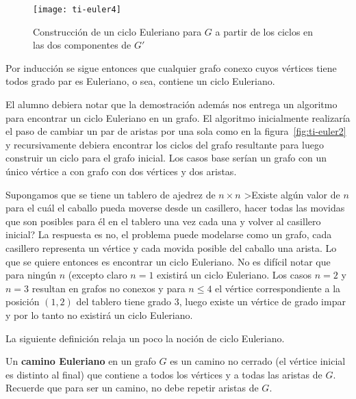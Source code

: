 \begin{teorema}
\begin{demostracion}
\begin{inducciondemo}
  \begin{figure}[h!]
  \centering
  \texttt{[image: ti-euler4]}
  \caption{Construcción de un ciclo Euleriano para $G$ a partir de los ciclos en las dos componentes de $G'$}
  \label{fig:ti-euler4}
  \end{figure}
  
  Por inducción se sigue entonces que cualquier grafo conexo cuyos vértices tiene todos grado par es Euleriano, o sea, contiene un ciclo Euleriano.
\end{inducciondemo}
\end{demostracion}
\end{teorema}

El alumno debiera notar que la demostración además nos entrega un algoritmo para encontrar un ciclo Euleriano en un grafo.
El algoritmo inicialmente realizaría el paso de cambiar un par de aristas por una sola como en la figura~\ref{fig:ti-euler2} y recursivamente debiera encontrar los ciclos del grafo resultante para luego construir un ciclo para el grafo inicial.
Los casos base serían un grafo con un único vértice a con grafo con dos vértices y dos aristas.

\begin{ejemplo}
Supongamos que se tiene un tablero de ajedrez de $n\times n$
>Existe algún valor de $n$ para el cuál el caballo pueda moverse desde un casillero, hacer todas las movidas que son posibles para él en el tablero una vez cada una y volver al casillero inicial?
La respuesta es no, el problema puede modelarse como un grafo, cada casillero representa un vértice y cada movida posible del caballo una arista.
Lo que se quiere entonces es encontrar un ciclo Euleriano.
No es difícil notar que para ningún $n$ (excepto claro $n=1$ existirá un ciclo Euleriano.
Los casos $n=2$ y $n=3$ resultan en grafos no conexos y para $n\leq 4$ el vértice correspondiente a la posición $(1,2)$ del tablero tiene grado $3$, luego existe un vértice de grado impar y por lo tanto no existirá un ciclo Euleriano.
\end{ejemplo}

La siguiente definición relaja un poco la noción de ciclo Euleriano.

\begin{definicion}
Un {\bf camino Euleriano} en un grafo $G$ es un camino no cerrado (el vértice inicial es distinto al final) que contiene a todos los vértices y a todas las aristas de $G$.
Recuerde que para ser un camino, no debe repetir aristas de $G$.
\end{definicion}


